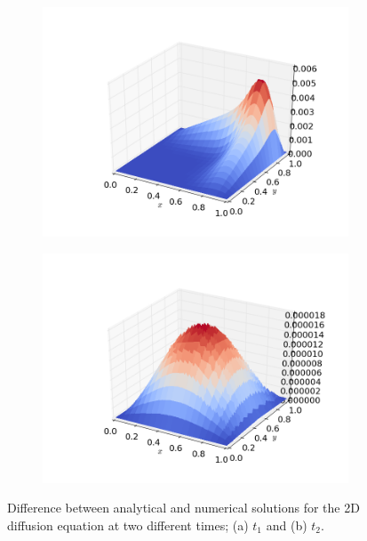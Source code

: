 \documentclass[12pt, a4paper]{article}
\begin{document}
\begin{figure}[ht!]
	\centering 
 	\begin{subfigure}[b]{0.495\textwidth}
		\includegraphics[width=\textwidth]{../Programs/Output/Delta_2d_t1.png}
        \caption{}
  	\end{subfigure}
  	\begin{subfigure}[b]{0.495\textwidth}
		\includegraphics[width=\textwidth]{../Programs/Output/Delta_2d_t2.png}
        \caption{}
  	\end{subfigure}	
  	\caption{Difference between analytical and numerical solutions for the 2D diffusion equation at 
  	two different times; (a) $t_1$ and (b) $t_2$.}
  	\label{fig:2d_delta}
\end{figure}
\end{document}
